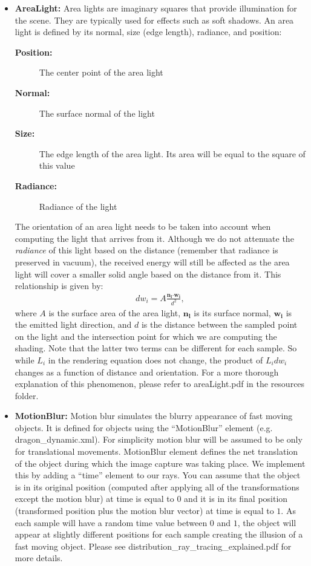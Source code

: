 \documentclass[12pt]{article}
\begin{document}
\begin{itemize}
\item \textbf{AreaLight:} Area lights are imaginary squares that provide
illumination for the scene. They are typically used for effects such as
soft shadows. An area light is defined by its normal, size (edge length),
radiance, and position:
%
\begin{description}
\item[\textbf{Position:}] The center point of the area light
\item[\textbf{Normal:}] The surface normal of the light
\item[\textbf{Size:}] The edge length of the area light. Its area will be equal
to the square of this value
\item[\textbf{Radiance:}] Radiance of the light
\end{description}
%
The orientation of an area light needs to be taken into account
when computing the light that arrives from it. 
Although we do not attenuate the \emph{radiance} of this light based on
the distance (remember that radiance is preserved in vacuum), the
received energy will still be affected as the area light will cover a
smaller solid angle based on the distance from it. This relationship is given by:
%
\begin{align}
dw_i = A \frac{\mathbf{n_l} \boldsymbol{\cdot} \mathbf{w_i}}{d^2},
\end{align}
%
where $A$ is the surface area of the area light, $\mathbf{n_l}$ is its surface
normal, $\mathbf{w_i}$ is the emitted light direction, and $d$ is the distance between the
sampled point on the light and the intersection point for which we are
computing the shading. Note that the latter two terms can be different
for each sample. So while $L_i$ in the rendering equation does not
change, the product of $L_i dw_i$ changes as a function of distance and
orientation.  For a more thorough explanation of this
phenomenon, please refer to areaLight.pdf in the resources folder.

\item \textbf{MotionBlur:} Motion blur simulates the blurry appearance of fast moving objects. It
is defined for objects using the ``MotionBlur'' element (e.g.
        dragon\_dynamic.xml). For simplicity motion blur will be assumed
to be only for translational movements. MotionBlur element defines the
net translation of the object during which the image capture was
taking place. We implement this by adding a ``time'' element to our
rays. You can assume that the object is in its original position
(computed after applying all of the transformations except the motion
 blur) at time
is equal to $0$ and it is in its final position (transformed position plus
        the motion blur vector) at time is equal to $1$. As each sample
will have a random time value between $0$ and $1$, the object will
appear at slightly different positions for each sample creating the
illusion of a fast moving object. Please see 
distribution\_ray\_tracing\_explained.pdf for more details.


\end{itemize}
\end{document}
